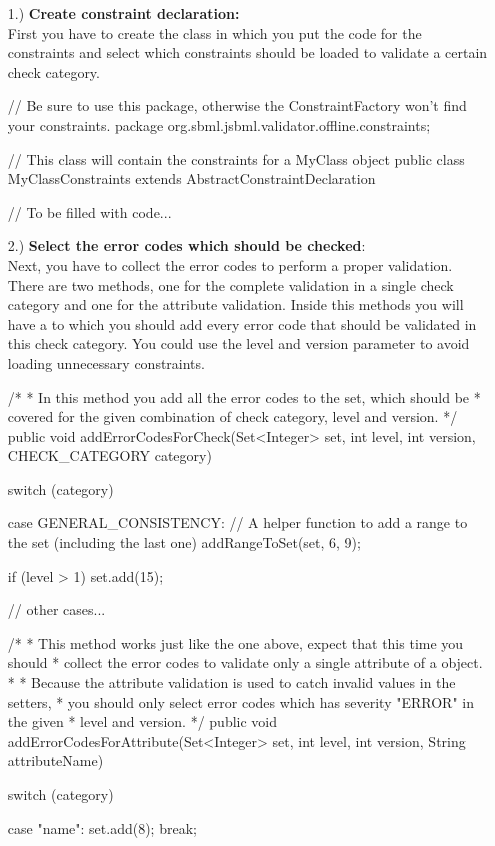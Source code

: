 \begin{itemize}
\item[1.)] \textbf{Create constraint declaration:}\\
First you have to create the class in which you put the code for the constraints and select which constraints should be loaded to validate a certain check category.
\begin{example}[style=java, title={Create constraint declaration class}]
// Be sure to use this package, otherwise the ConstraintFactory won't find your constraints.
package org.sbml.jsbml.validator.offline.constraints;

// This class will contain the constraints for a MyClass object
public class MyClassConstraints extends AbstractConstraintDeclaration {
	
	// To be filled with code...
}
\end{example}

\item[2.)] \textbf{Select the error codes which should be checked}:\\
Next, you have to collect the error codes to perform a proper validation. There are two methods, one for the complete validation in a single check category and one for the attribute validation. Inside this methods you will have a  to which you should add every error code that should be validated in this check category. You could use the level and version parameter to avoid loading unnecessary constraints.
\begin{example}[style=java, title={Select error codes}]
  /*
   * In this method you add all the error codes to the set, which should be 
   * covered for the given combination of check category, level and version.
   */
  public void addErrorCodesForCheck(Set<Integer> set, int level, int version,
    CHECK_CATEGORY category) {
    
    switch (category) {
    case GENERAL_CONSISTENCY:
    	// A helper function to add a range to the set (including the last one)
    	addRangeToSet(set, 6, 9);
    		
    	if (level > 1)
    	{
    		set.add(15);
    	}
    
    // other cases...
  	
    }
	
  }


  /*
   * This method works just like the one above, expect that this time you should
   * collect the error codes to validate only a single attribute of a object.
   *
   * Because the attribute validation is used to catch invalid values in the setters,
   * you should only select error codes which has severity "ERROR" in the given
   *  level and version.
   */
  public void addErrorCodesForAttribute(Set<Integer> set, int level,
    int version, String attributeName) {
	switch (category) {
    case "name":
    	set.add(8);
    	break;
    	
}}
\end{example}
\end{itemize}
